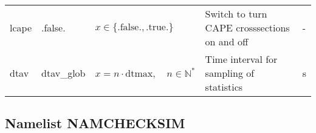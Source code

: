 \documentclass[twoside,11pt,fleqn,a4paper,english,openright]{report}
\begin{document}
\begin{center}
  \tablelasttail{
        &&&&\\\hline
  }
\begin{supertabular}{|l|p{1.6cm}|p{4cm}|p{6cm}|l|}
  lcape	& .false.	& $x\in\{\text{.false.},\text{.true.}\}$	& Switch to turn CAPE crosssections on and off & -\\
  dtav		& dtav\_glob	& $x = n \cdot \text{dtmax}, \quad n \in \mathbb{N}^*$	& Time interval for sampling of statistics	& s\\
\end{supertabular}
\end{center}

\subsection{Namelist NAMCHECKSIM}\label{par:checksim}
\end{document}

